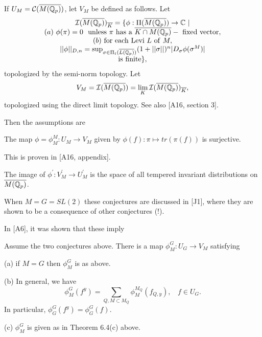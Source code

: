If $U_M={\cal{C}}(\overline{M({\Bbb{Q}}_p)})$, let
$V_M$ be defined as follows.
Let
\[
\begin{array}{c}
{\cal{I}}(\overline{M({\Bbb{Q}}_p)})_{\overline{K}}
=\{\phi: \Pi(\overline{M({\Bbb{Q}}_p)})\rightarrow {\Bbb{C}} \ | \\
(a) \ \phi(\pi)=0\ {\rm \ unless\ }\pi{\rm \ has\ a\ }
\overline{K\cap M({\Bbb{Q}}_p)}-{\rm \ fixed\ vector},\\
(b)\ {\rm for \ each\ Levi\ }L{\rm\ of\ }M,\\
||\phi||_{D,n}=\sup_{\sigma\in \Pi_t(\overline{L({\Bbb{Q}}_p)})}
(1+||\sigma||)^n|D_\sigma \phi(\sigma^M)|\\
{\rm is\ finite}\},
\end{array}
\]
topologized by the semi-norm topology. Let
\begin{equation}
V_M=
{\cal{I}}(\overline{M({\Bbb{Q}}_p)})
=\lim_{K}{\cal{I}}(\overline{M({\Bbb{Q}}_p)})_{\overline{K}},
\end{equation}
topologized using the direct limit topology.
See also [A16, section 3].

Then the assumptions are

\begin{conjecture}
The map $\phi =\phi_M^M :U_M\rightarrow V_M$ given by
$\phi (f):\pi \longmapsto tr(\pi (f)) $ is surjective.
\end{conjecture}

This is proven in [A16, appendix].

\begin{conjecture}
The image of $\phi ^{\prime }:V_M^{\prime }\rightarrow U_M^{\prime }$ is the
space of all tempered invariant distributions on
$\overline{M({\Bbb{Q}}_p)}$.
\end{conjecture}

When $M=G=SL(2)$ these conjectures are discussed in [J1], where
they are shown to be a consequence of other conjectures (!).

In [A6], it was shown that these imply
\begin{theorem} Assume the two conjectures above.
There is a map
$\phi^G_M :U_G\rightarrow V_M$ satisfying

(a) if $M=G$ then $\phi_M^G$ is as above.

(b) In general, we have
\[
\phi_M^G(f^y)=
\sum_{ Q , M\subset M_Q}
\phi_M^{M_Q}(f_{Q,y}),\ \ \ \ f\in U_G.
\]
In particular, $\phi_G^G(f^y)=\phi_G^G(f)$.

(c) $\phi_M^G$ is given as in Theorem 6.4(c) above.
\end{theorem}

